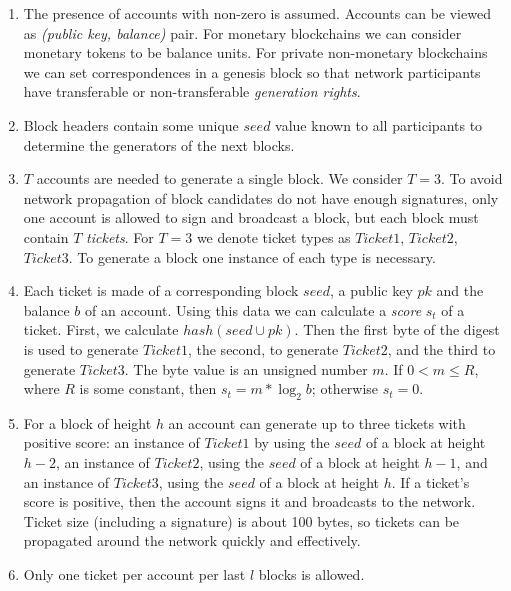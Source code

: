 \documentclass[preprint,review,3p,times,twocolumn]{elsarticle}
\begin{document}
\begin{enumerate}

\item The presence of accounts with non-zero is assumed. Accounts can be viewed as \textit{(public key, balance)} pair. For monetary blockchains we can consider monetary tokens to be balance units. For private non-monetary blockchains we can set correspondences in a genesis block so that network participants have transferable or non-transferable \textit{generation rights}.

\item Block headers contain some unique \(seed\) value known to all participants to determine the generators of the next blocks.

\item \(T\) accounts are needed to generate a single block. We consider \(T = 3\). To avoid network propagation of block candidates do not have enough signatures, only one account is allowed to sign and broadcast a block, but each block must contain \(T\) \textit{tickets}. For \(T = 3\) we denote ticket types as \(Ticket1\), \(Ticket2\), \(Ticket3\). To generate a block one instance of each type is necessary.  

\item Each ticket is made of a corresponding block \(seed\), a public key \(pk\) and the balance \(b\) of an account. Using this data we can calculate a \textit{score} \(s_t\) of a ticket. First, we calculate \(hash(seed \cup pk)\). Then the first byte of the digest is used to generate \(Ticket1\), the second, to generate \(Ticket2\), and the third to generate \(Ticket3\). The byte value is an unsigned number \(m\). If  \(0 < m \leqslant R\), where \(R\) is some constant, then \(s_t=m * \log_2 b\); otherwise \(s_t=0\).

\item For a block of height \(h\) an account can generate up to three tickets with positive score: an instance of \(Ticket1\) by using the \(seed\) of a block at height \(h-2\), an instance of \(Ticket2\), using the \(seed\) of a block at height \(h-1\), and an instance of \(Ticket3\), using the \(seed\) of a block at height \(h\). If a ticket's score is positive, then the account signs it and broadcasts to the network. Ticket size (including a signature) is about 100 bytes, so tickets can be propagated around the network quickly and effectively. 

\item Only one ticket per account per last \(l\) blocks is allowed.


\end{enumerate}
\end{document}
